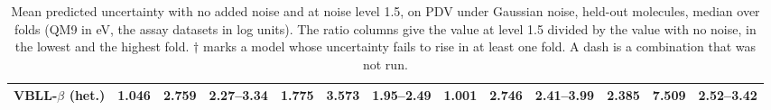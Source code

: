 \begin{table}[!htbp]
\begin{adjustbox}{max width=\textwidth,max totalheight=0.78\textheight}
\begin{tabular}{lcccccccccccc}
VBLL-$\beta$ (het.) & 1.046 & 2.759 & 2.27--3.34 & 1.775 & 3.573 & 1.95--2.49 & 1.001 & 2.746 & 2.41--3.99 & 2.385 & 7.509 & 2.52--3.42 \\
\bottomrule
\end{tabular}
\end{adjustbox}
\caption[Mean predicted uncertainty with and without added noise.]{Mean predicted uncertainty with no added noise and at noise level 1.5, on PDV under Gaussian noise, held-out molecules, median over folds (QM9 in eV, the assay datasets in log units). The ratio columns give the value at level 1.5 divided by the value with no noise, in the lowest and the highest fold. $\dagger$ marks a model whose uncertainty fails to rise in at least one fold. A dash is a combination that was not run.}
\label{tab:uncertainty_rise}
\end{table}

